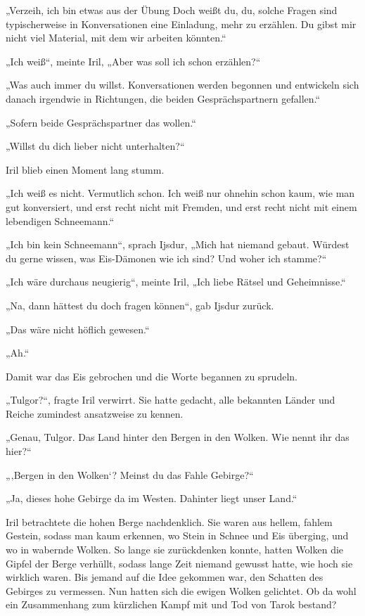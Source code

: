 „Verzeih, ich bin etwas aus der Übung Doch weißt du, du, solche Fragen sind typischerweise in Konversationen eine Einladung, mehr zu erzählen. Du gibst mir nicht viel Material, mit dem wir arbeiten könnten.“

„Ich weiß“, meinte Iril, „Aber was soll ich schon erzählen?“

„Was auch immer du willst. Konversationen werden begonnen und entwickeln sich danach irgendwie in Richtungen, die beiden Gesprächspartnern gefallen.“

„Sofern beide Gesprächspartner das wollen.“

„Willst du dich lieber nicht unterhalten?“

Iril blieb einen Moment lang stumm.

„Ich weiß es nicht. Vermutlich schon. Ich weiß nur ohnehin schon kaum, wie man gut konversiert, und erst recht nicht mit Fremden, und erst recht nicht mit einem lebendigen Schneemann.“

„Ich bin kein Schneemann“, sprach Ijsdur, „Mich hat niemand gebaut. Würdest du gerne wissen, was Eis-Dämonen wie ich sind? Und woher ich stamme?“

„Ich wäre durchaus neugierig“, meinte Iril, „Ich liebe Rätsel und Geheimnisse.“

„Na, dann hättest du doch fragen können“, gab Ijsdur zurück.

„Das wäre nicht höflich gewesen.“

„Ah.“

Damit war das Eis gebrochen und die Worte begannen zu sprudeln.\bigskip







„Tulgor?“, fragte Iril verwirrt. Sie hatte gedacht, alle bekannten Länder und Reiche zumindest ansatzweise zu kennen.

„Genau, Tulgor. Das Land hinter den Bergen in den Wolken. Wie nennt ihr das hier?“

„‚Bergen in den Wolken‘? Meinst du das Fahle Gebirge?“

„Ja, dieses hohe Gebirge da im Westen. Dahinter liegt unser Land.“

Iril betrachtete die hohen Berge nachdenklich. Sie waren aus hellem, fahlem Gestein, sodass man kaum erkennen, wo Stein in Schnee und Eis überging, und wo in wabernde Wolken. So lange sie zurückdenken konnte, hatten Wolken die Gipfel der Berge verhüllt, sodass lange Zeit niemand gewusst hatte, wie hoch sie wirklich waren. Bis jemand auf die Idee gekommen war, den Schatten des Gebirges zu vermessen. Nun hatten sich die ewigen Wolken gelichtet. Ob da wohl ein Zusammenhang zum kürzlichen Kampf mit und Tod von Tarok bestand?

